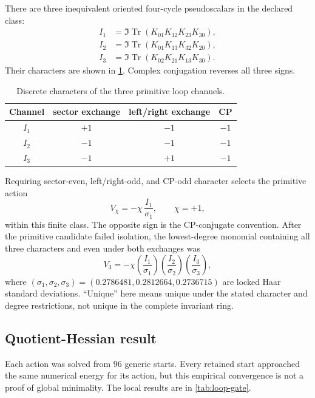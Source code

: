 \documentclass[11pt]{article}
\newcommand{\Tr}{\operatorname{Tr}}
\begin{document}
There are three inequivalent oriented four-cycle pseudoscalars in the declared class:
\begin{align}
 I_1&=\Im\Tr(K_{01}K_{12}K_{23}K_{30}),\nonumber\\
 I_2&=\Im\Tr(K_{01}K_{13}K_{32}K_{20}),\nonumber\\
 I_3&=\Im\Tr(K_{02}K_{21}K_{13}K_{30}).
 \label{eq:loops}
\end{align}
Their characters are shown in \cref{tab:loop-characters}.  Complex conjugation reverses all three signs.

\begin{table}[t]
\centering
\caption{Discrete characters of the three primitive loop channels.}
\label{tab:loop-characters}
\begin{tabular}{@{}cccc@{}}
\toprule
Channel & sector exchange & left/right exchange & CP \\
\midrule
$I_1$ & $+1$ & $-1$ & $-1$ \\
$I_2$ & $-1$ & $-1$ & $-1$ \\
$I_3$ & $-1$ & $+1$ & $-1$ \\
\bottomrule
\end{tabular}
\end{table}

Requiring sector-even, left/right-odd, and CP-odd character selects the primitive action
\begin{equation}
  V_\chi=-\chi\,\frac{I_1}{\sigma_1},\qquad \chi=+1,
  \label{eq:vchi}
\end{equation}
within this finite class.  The opposite sign is the CP-conjugate convention.  After the primitive candidate failed isolation, the lowest-degree monomial containing all three characters and even under both exchanges was
\begin{equation}
  V_3=-\chi
  \left(\frac{I_1}{\sigma_1}\right)
  \left(\frac{I_2}{\sigma_2}\right)
  \left(\frac{I_3}{\sigma_3}\right),
  \label{eq:v3}
\end{equation}
where $(\sigma_1,\sigma_2,\sigma_3)=(0.2786481,0.2812664,0.2736715)$ are locked Haar standard deviations.  ``Unique'' here means unique under the stated character and degree restrictions, not unique in the complete invariant ring.

\subsection{Quotient-Hessian result}

Each action was solved from 96 generic starts.  Every retained start approached the same numerical energy for its action, but this empirical convergence is not a proof of global minimality.  The local results are in \cref{tab:loop-gate}.
\end{document}

